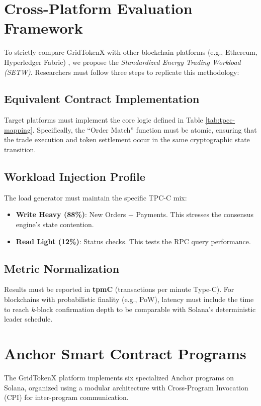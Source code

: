 \documentclass[conference]{IEEEtran}
\begin{document}
{\section{Cross-Platform Evaluation Framework}
To strictly compare GridTokenX with other blockchain platforms (e.g., Ethereum, Hyperledger Fabric) \cite{b4}, we propose the \textit{Standardized Energy Trading Workload (SETW)}. Researchers must follow three steps to replicate this methodology:

\subsection{Equivalent Contract Implementation}
Target platforms must implement the core logic defined in Table \ref{tab:tpcc-mapping}. Specifically, the ``Order Match'' function must be atomic, ensuring that the trade execution and token settlement occur in the same cryptographic state transition.

\subsection{Workload Injection Profile}
The load generator must maintain the specific TPC-C mix:
\begin{itemize}
    \item \textbf{Write Heavy (88\%)}: New Orders + Payments. This stresses the consensus engine's state contention.
    \item \textbf{Read Light (12\%)}: Status checks. This tests the RPC query performance.
\end{itemize}

\subsection{Metric Normalization}
Results must be reported in \textbf{tpmC} (transactions per minute Type-C). For blockchains with probabilistic finality (e.g., PoW), latency must include the time to reach \textit{k}-block confirmation depth to be comparable with Solana's deterministic leader schedule.

\section{Anchor Smart Contract Programs}

The GridTokenX platform implements six specialized Anchor programs on Solana, organized using a modular architecture with Cross-Program Invocation (CPI) for inter-program communication.

}
\end{document}
